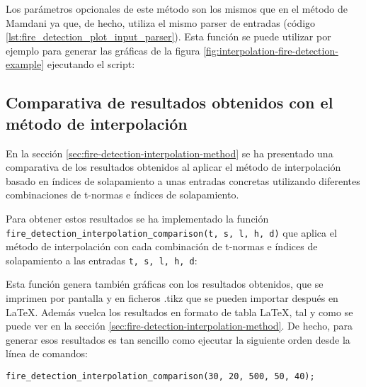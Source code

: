 Los parámetros opcionales de este método son los mismos que en el método de Mamdani ya que, de hecho, utiliza el mismo parser de entradas (código \ref{lst:fire_detection_plot_input_parser}). Esta función se puede utilizar por ejemplo para generar las gráficas de la figura \ref{fig:interpolation-fire-detection-example} ejecutando el script:



\subsection{Comparativa de resultados obtenidos con el método de interpolación}
En la sección \ref{sec:fire-detection-interpolation-method} se ha presentado una comparativa de los resultados obtenidos al aplicar el método de interpolación basado en índices de solapamiento a unas entradas concretas utilizando diferentes combinaciones de t-normas e índices de solapamiento.

Para obtener estos resultados se ha implementado la función  \lstinline|fire_detection_interpolation_comparison(t, s, l, h, d)| que aplica el método de interpolación con cada combinación de t-normas e índices de solapamiento  a las entradas \lstinline|t, s, l, h, d|:



Esta función genera también gráficas con los resultados obtenidos, que se imprimen por pantalla y en ficheros .tikz que se pueden importar después en \LaTeX . Además vuelca los resultados en formato de tabla \LaTeX, tal y como se puede ver en la sección \ref{sec:fire-detection-interpolation-method}. De hecho, para generar esos resultados es tan sencillo como ejecutar la siguiente orden desde la línea de comandos:

\begin{lstlisting}
fire_detection_interpolation_comparison(30, 20, 500, 50, 40);
\end{lstlisting}
